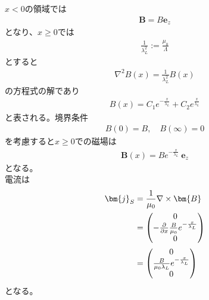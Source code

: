 \documentclass[dvipdfmx, 11pt, a4paper]{jsarticle}
\numberwithin{equation}{section}
\theoremstyle{definition}
\begin{document}
    \begin{derivationBox}
        $x < 0$の領域では
        \begin{align}
            \bm{B} = B \bm{e}_z
        \end{align}
        となり、$x\ge0$では
        \begin{align}
            \frac{1}{\lambda_L^2} := \frac{\mu_0}{\Lambda} 
        \end{align}
        とすると
        \begin{align}
            \nabla^2 B(x) = \frac{1}{\lambda_L^2} B(x) 
        \end{align}
        の方程式の解であり
        \begin{align}
            B(x) = C_1 e^{-\frac{x}{\lambda_L}} + C_2 e^{\frac{x}{\lambda_L}}
        \end{align}
        と表される。境界条件
        \begin{align}
            B(0) = B,\quad B(\infty) = 0
        \end{align}
        を考慮すると$x \ge 0$での磁場は
        \begin{align}
            \bm{B}(x) = B e^{-\frac{x}{\lambda_L}}\ \bm{e}_z
        \end{align}
        となる。\\
        電流は
        \begin{align}
            \bm{j}_S &= \frac{1}{\mu_0}\nabla \times \bm{B} \notag \\
            &= 
            \left(
            \begin{matrix}
                0\\
                -\frac{\partial}{\partial x} \frac{B}{\mu_0} e^{-\frac{x}{\lambda_L}}\\
                0
            \end{matrix}
            \right) \notag \\
            &= 
            \left(
            \begin{matrix}
                0\\
                \frac{B}{\mu_0\lambda_L} e^{-\frac{x}{\lambda_L}}\\
                0
            \end{matrix}
            \right)
        \end{align}
        となる。
    \end{derivationBox}
\end{document}
